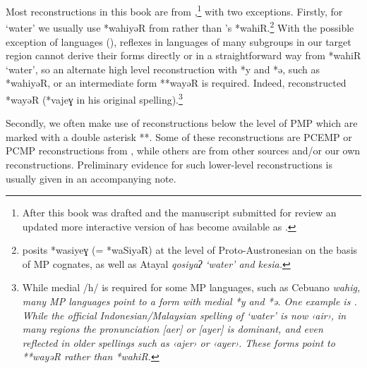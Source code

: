 Most reconstructions in this book are from \citet{BlustTrussel2020},\footnote{
		After this book was drafted
		and the manuscript submitted for review
		an updated more interactive version of
		\citet{BlustTrussel2020} has become
		available as \citet{BlustSmith2023}.}
with two exceptions.
Firstly, for ‘water’ we usually use *wahiyəR from \citet[1027]{Wolff2010}
rather than \citeauthor{BlustTrussel2020}'s *wahiR.\footnote{
		\citet[1027]{Wolff2010} posits
		*wasiyeɣ (= *waSiyəR) at the level of
		Proto-Austronesian on the basis of MP cognates,
		as well as Atayal \it{qosiyaʔ} ‘water’
		and  \it{kesia}.}
With the possible exception of  languages (),
reflexes in languages of many subgroups in our target region
cannot derive their forms directly or in a straightforward way from *wahiR ‘water’,
so an alternate high level reconstruction with *y
and *ə, such as \citeauthor{Wolff2010} *wahiyəR,
or an intermediate form **wayəR is required.
Indeed, \citet[167]{Dempwolff1938} reconstructed *wayəR
(*vajeɣ in his original spelling).\footnote{
		While medial /h/ is required for some MP languages,
		such as Cebuano \it{wahig},
		many MP languages point to a form with medial *y and *ə.
		One example is .
		While the official Indonesian/Malaysian spelling of ‘water’ is now ‹air›,
		in many regions the pronunciation [aer] or [ayer] is dominant,
		and even reflected in older spellings such as ‹ajer› or ‹ayer›.
		These forms point to **wayəR rather than *wahiR.}

Secondly, we often make use of reconstructions below the
level of PMP which are marked with a double asterisk **.
Some of these reconstructions are PCEMP or PCMP
reconstructions from \citet{BlustTrussel2020},
while others are from other sources
and/or our own reconstructions.
Preliminary evidence for such lower-level reconstructions
is usually given in an accompanying note.
